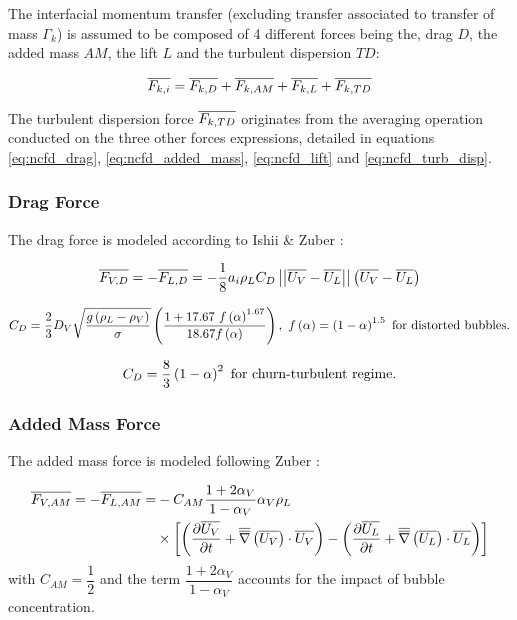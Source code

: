 The interfacial momentum transfer (excluding transfer associated to transfer of mass $\Gamma_{k}$) is assumed to be composed of 4 different forces being the, drag $D$, the added mass $AM$, the lift $L$ and the turbulent dispersion $TD$:

\begin{equation}
\overline{F_{k,i}}=\overline{F_{k,D}} + \overline{F_{k,AM}} +\overline{F_{k,L}} +\overline{F_{k,TD}}
\label{eq:ncfd_force_balance}
\end{equation}

\npar

The turbulent dispersion force $\overline{F_{k,TD}}$ originates from the averaging operation conducted on the three other forces expressions, detailed in equations \ref{eq:ncfd_drag}, \ref{eq:ncfd_added_mass}, \ref{eq:ncfd_lift} and \ref{eq:ncfd_turb_disp}.

\subsubsection{Drag Force}

The drag force is modeled according to Ishii \& Zuber \cite{ishii_drag_1979}:

\begin{equation}
\overline{F_{V,D}}=-\overline{F_{L,D}}=-\frac{1}{8}a_{i}\rho_{L}C_{D}\left|\left|{ \overline{U_{V}}-\overline{U_{L}} }\right|\right|\left( \overline{U_{V}}-\overline{U_{L}}  \right)
\label{eq:ncfd_drag}
\end{equation}

\begin{equation}
C_{D} = \frac{2}{3}D_{V}\sqrt{\dfrac{g\parth{\rho_{L}-\rho_{V}}}{\sigma}}\parth{ \frac{1 + 17.67~f\parth{\alpha}^{1.67}}{18.67f\parth{\alpha}} }, \ f\parth{\alpha} = \parth{1-\alpha}^{1.5}\ \text{for distorted bubbles.}
\end{equation}

\begin{equation}
C_{D} = \frac{8}{3} \left( 1-\alpha \right)^{2}\ \text{for churn-turbulent regime.}
\end{equation}

\subsubsection{Added Mass Force}

The added mass force is modeled  following Zuber \cite{zuber_dispersed_1964}:

\begin{align}
\overline{F_{V,AM}}=-\overline{F_{L,AM}}=&-C_{AM} \frac{1+2\alpha_{V}}{1-\alpha_{V}}\alpha_{V}\rho_{L}\\
&\times \left[  \left( \frac{\partial{\overline{U_{V}}}}{\partial t}+\overline{\overline{\nabla}}\left({\overline{U_{V}}}\right)\cdot \overline{U_{V}}  \right) - \left( \frac{\partial{\overline{U_{L}}}}{\partial t}+\overline{\overline{\nabla}}\left({\overline{U_{L}}}\right)\cdot \overline{U_{L}}  \right)  \right]
\label{eq:ncfd_added_mass}
\end{align}
with $C_{AM}=\dfrac{1}{2}$ and the term $\dfrac{1+2\alpha_{V}}{1-\alpha_{V}}$ accounts for the impact of bubble concentration.

